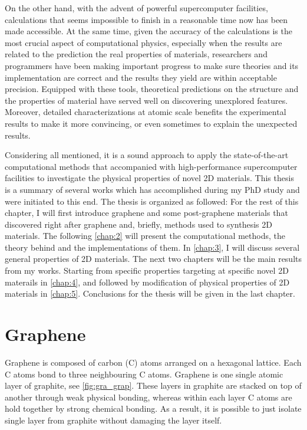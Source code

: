 On the other hand, with the advent of powerful supercomputer facilities, calculations that seems impossible to finish in a reasonable time now has been made accessible. At the same time, given the accuracy of the calculations is the most crucial aspect of computational physics, especially when the results are related to the prediction the real properties of materials, researchers and programmers have been making important progress to make sure theories and its implementation are correct and the results they yield are within acceptable precision. Equipped with these tools, theoretical predictions on the structure and the properties of material have served well on discovering unexplored features. Moreover, detailed characterizations at atomic scale benefits the experimental results to make it more convincing, or even sometimes to explain the unexpected results.

Considering all mentioned, it is a sound approach to apply the state-of-the-art computational methods that accompanied with high-performance supercomputer facilities to investigate the physical properties of novel 2D materials. This thesis is a summary of several works which has accomplished during my PhD study and were initiated to this end. The thesis is organized as followed: For the rest of this chapter, I will first introduce graphene and some post-graphene materials that discovered right after graphene and, briefly, methods used to synthesis 2D materials. The following \autoref{chap:2} will present the computational methods, the theory behind and the implementations of them. In \autoref{chap:3}, I will discuss several general properties of 2D materials. The next two chapters will be the main results from my works. Starting from specific properties targeting at specific novel 2D materails in \autoref{chap:4}, and followed by modification of physical properties of 2D materials in \autoref{chap:5}. Conclusions for the thesis will be given in the last chapter.


\section{Graphene}

Graphene is composed of carbon (C) atoms arranged on a hexagonal lattice. Each C atoms bond to three neighbouring C atoms. Graphene is one single atomic layer of graphite, see \autoref{fig:gra_grap}. These layers in graphite are stacked on top of another through weak physical bonding, whereas within each layer C atoms are hold together by strong chemical bonding. As a result, it is possible to just isolate single layer from graphite without damaging the layer itself. 

